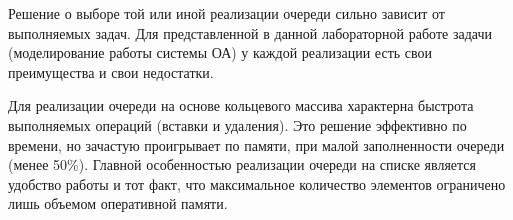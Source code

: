 \Conclusion

Решение о выборе той или иной реализации очереди сильно зависит от выполняемых задач. Для представленной в данной лабораторной работе задачи (моделирование работы системы ОА) у каждой реализации есть свои преимущества и свои недостатки.

Для реализации очереди на основе кольцевого массива характерна быстрота выполняемых операций (вставки и удаления). Это решение эффективно по времени, но зачастую проигрывает по памяти, при малой заполненности очереди (менее 50\%). Главной особенностью реализации очереди на списке является удобство работы и тот факт, что максимальное количество элементов ограничено лишь объемом оперативной памяти.
